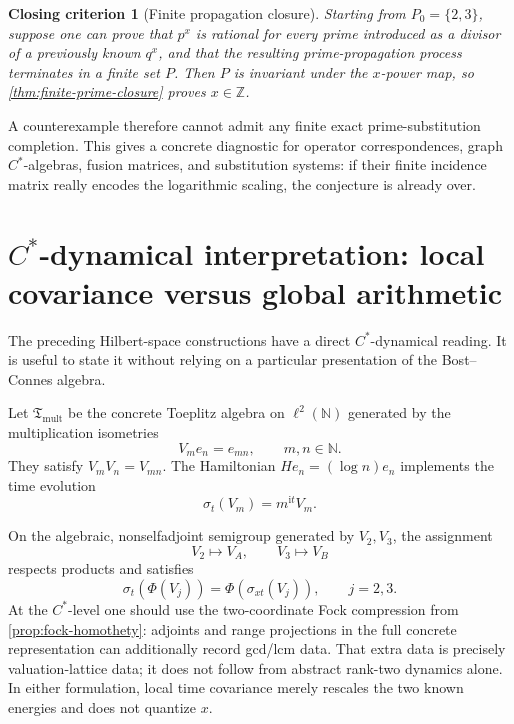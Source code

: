 \documentclass[11pt,oneside]{article}
\newtheorem{criterion}[theorem]{Closing criterion}
\theoremstyle{definition}
\theoremstyle{remark}
\newcommand{\N}{\mathbb N}
\newcommand{\Z}{\mathbb Z}
\newcommand{\ii}{\mathrm i}
\begin{document}
\begin{criterion}[Finite propagation closure]\label{crit:finite-propagation}
Starting from \(P_0=\{2,3\}\), suppose one can prove that \(p^x\) is
rational for every prime introduced as a divisor of a previously known
\(q^x\), and that the resulting prime-propagation process terminates in
a finite set \(P\).  Then \(P\) is invariant under the \(x\)-power map,
so \cref{thm:finite-prime-closure} proves \(x\in\Z\).
\end{criterion}

A counterexample therefore cannot admit any finite exact
prime-substitution completion.  This gives a concrete diagnostic for
operator correspondences, graph \(C^*\)-algebras, fusion matrices, and
substitution systems: if their finite incidence matrix really encodes
the logarithmic scaling, the conjecture is already over.

\section{\(C^*\)-dynamical interpretation: local covariance versus global arithmetic}

The preceding Hilbert-space constructions have a direct
\(C^*\)-dynamical reading.  It is useful to state it without relying on
a particular presentation of the Bost--Connes algebra.

Let \(\mathfrak T_{\mathrm{mult}}\) be the concrete Toeplitz algebra on
\(\ell^2(\N)\) generated by the multiplication isometries
\[
        V_m e_n=e_{mn},\qquad m,n\in\N.
\]
They satisfy \(V_mV_n=V_{mn}\).  The Hamiltonian \(H e_n=(\log n)e_n\)
implements the time evolution
\begin{equation}\label{eq:time-evolution}
        \sigma_t(V_m)=m^{\ii t}V_m.
\end{equation}

On the algebraic, nonselfadjoint semigroup generated by
\(V_2,V_3\), the assignment
\[
        V_2\longmapsto V_A,\qquad
        V_3\longmapsto V_B
\]
respects products and satisfies
\[
        \sigma_t\!\left(\Phi(V_j)\right)
        =\Phi\!\left(\sigma_{xt}(V_j)\right),
        \qquad j=2,3.
\]
At the \(C^*\)-level one should use the two-coordinate Fock compression
from \cref{prop:fock-homothety}: adjoints and range projections in the
full concrete representation can additionally record gcd/lcm data.
That extra data is precisely valuation-lattice data; it does not follow
from abstract rank-two dynamics alone.  In either formulation, local
time covariance merely rescales the two known energies and does not
quantize \(x\).
\end{document}
